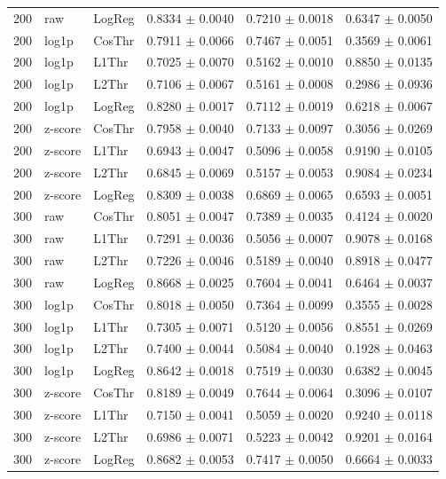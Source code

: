 \begin{longtable}{rllccc}
200 & raw & LogReg & 0.8334 $\pm$ 0.0040 & 0.7210 $\pm$ 0.0018 & 0.6347 $\pm$ 0.0050 \\
200 & log1p & CosThr & 0.7911 $\pm$ 0.0066 & 0.7467 $\pm$ 0.0051 & 0.3569 $\pm$ 0.0061 \\
200 & log1p & L1Thr & 0.7025 $\pm$ 0.0070 & 0.5162 $\pm$ 0.0010 & 0.8850 $\pm$ 0.0135 \\
200 & log1p & L2Thr & 0.7106 $\pm$ 0.0067 & 0.5161 $\pm$ 0.0008 & 0.2986 $\pm$ 0.0936 \\
200 & log1p & LogReg & 0.8280 $\pm$ 0.0017 & 0.7112 $\pm$ 0.0019 & 0.6218 $\pm$ 0.0067 \\
200 & z-score & CosThr & 0.7958 $\pm$ 0.0040 & 0.7133 $\pm$ 0.0097 & 0.3056 $\pm$ 0.0269 \\
200 & z-score & L1Thr & 0.6943 $\pm$ 0.0047 & 0.5096 $\pm$ 0.0058 & 0.9190 $\pm$ 0.0105 \\
200 & z-score & L2Thr & 0.6845 $\pm$ 0.0069 & 0.5157 $\pm$ 0.0053 & 0.9084 $\pm$ 0.0234 \\
200 & z-score & LogReg & 0.8309 $\pm$ 0.0038 & 0.6869 $\pm$ 0.0065 & 0.6593 $\pm$ 0.0051 \\
300 & raw & CosThr & 0.8051 $\pm$ 0.0047 & 0.7389 $\pm$ 0.0035 & 0.4124 $\pm$ 0.0020 \\
300 & raw & L1Thr & 0.7291 $\pm$ 0.0036 & 0.5056 $\pm$ 0.0007 & 0.9078 $\pm$ 0.0168 \\
300 & raw & L2Thr & 0.7226 $\pm$ 0.0046 & 0.5189 $\pm$ 0.0040 & 0.8918 $\pm$ 0.0477 \\
300 & raw & LogReg & 0.8668 $\pm$ 0.0025 & 0.7604 $\pm$ 0.0041 & 0.6464 $\pm$ 0.0037 \\
300 & log1p & CosThr & 0.8018 $\pm$ 0.0050 & 0.7364 $\pm$ 0.0099 & 0.3555 $\pm$ 0.0028 \\
300 & log1p & L1Thr & 0.7305 $\pm$ 0.0071 & 0.5120 $\pm$ 0.0056 & 0.8551 $\pm$ 0.0269 \\
300 & log1p & L2Thr & 0.7400 $\pm$ 0.0044 & 0.5084 $\pm$ 0.0040 & 0.1928 $\pm$ 0.0463 \\
300 & log1p & LogReg & 0.8642 $\pm$ 0.0018 & 0.7519 $\pm$ 0.0030 & 0.6382 $\pm$ 0.0045 \\
300 & z-score & CosThr & 0.8189 $\pm$ 0.0049 & 0.7644 $\pm$ 0.0064 & 0.3096 $\pm$ 0.0107 \\
300 & z-score & L1Thr & 0.7150 $\pm$ 0.0041 & 0.5059 $\pm$ 0.0020 & 0.9240 $\pm$ 0.0118 \\
300 & z-score & L2Thr & 0.6986 $\pm$ 0.0071 & 0.5223 $\pm$ 0.0042 & 0.9201 $\pm$ 0.0164 \\
300 & z-score & LogReg & 0.8682 $\pm$ 0.0053 & 0.7417 $\pm$ 0.0050 & 0.6664 $\pm$ 0.0033 \\

\end{longtable}
